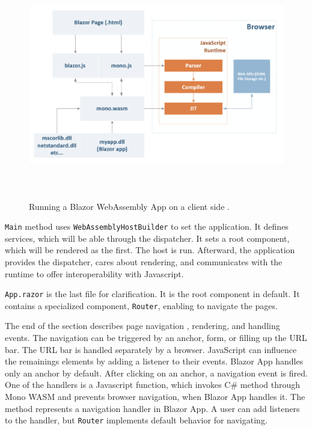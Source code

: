 \begin{figure}[b!]
\centering
\includegraphics[width=140mm, height=100mm]{./img/BlazorExecution}
\caption{Running a Blazor WebAssembly App on a client side \cite{online:composition}.}
\label{img08:wasm}
\end{figure}
\par
\texttt{Main} method uses \texttt{WebAssemblyHostBuilder} to set the application.
It defines services, which will be able through the dispatcher.
It sets a root component, which will be rendered as the first.
The host is run.
Afterward, the application provides the dispatcher, cares about rendering, and communicates with the runtime to offer interoperability with Javascript.
\par
\texttt{App.razor} is the last file for clarification.
It is the root component in default.
It contains a specialized component, \texttt{Router}, enabling to navigate the pages.
\par
The end of the section describes page navigation \cite{online:routing}, rendering, and handling events.
The navigation can be triggered by an anchor, form, or filling up the URL bar.
The URL bar is handled separately by a browser.
JavaScript can influence the remainings elements by adding a listener to their events.
Blazor App handles only an anchor by default.
After clicking on an anchor, a navigation event is fired.
One of the handlers is a Javascript function, which invokes C\# method through Mono WASM and prevents browser navigation, when Blazor App handles it. 
The method represents a navigation handler in Blazor App.
A user can add listeners to the handler, but \texttt{Router} implements default behavior for navigating.

